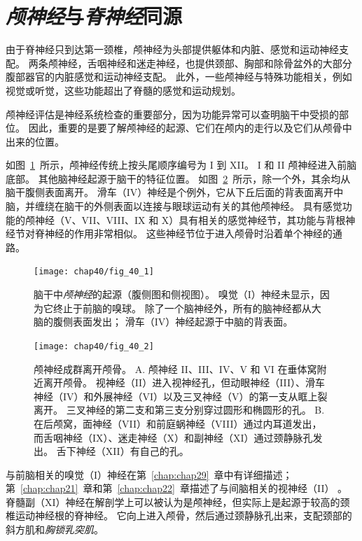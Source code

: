 \section{\textit{颅神经}与\textit{脊神经}同源}

由于脊神经只到达第一颈椎，颅神经为头部提供躯体和内脏、感觉和运动神经支配。
两条颅神经，舌咽神经和迷走神经，也提供颈部、胸部和除骨盆外的大部分腹部器官的内脏感觉和运动神经支配。
此外，一些颅神经与特殊功能相关，例如视觉或听觉，这些功能超出了脊髓的感觉和运动规划。


颅神经评估是神经系统检查的重要部分，因为功能异常可以查明脑干中受损的部位。
因此，重要的是要了解颅神经的起源、它们在颅内的走行以及它们从颅骨中出来的位置。


如图~\ref{fig:40_1}~所示，颅神经传统上按头尾顺序编号为 I 到 XII。
I 和 II 颅神经进入前脑底部。
其他脑神经起源于脑干的特征位置。
如图~\ref{fig:40_2}~所示，除一个外，其余均从脑干腹侧表面离开。
滑车（IV）神经是个例外，它从下丘后面的背表面离开中脑，并缠绕在脑干的外侧表面以连接与眼球运动有关的其他颅神经。
具有感觉功能的颅神经（V、VII、VIII、IX 和 X）具有相关的感觉神经节，其功能与背根神经节对脊神经的作用非常相似。
这些神经节位于进入颅骨时沿着单个神经的通路。


\begin{figure}[htbp]
	\centering
	\texttt{[image: chap40/fig\_40\_1]}
	\caption{脑干中\textit{颅神经}的起源（腹侧图和侧视图）。
		嗅觉（I）神经未显示，因为它终止于前脑的嗅球。
		除了一个脑神经外，所有的脑神经都从大脑的腹侧表面发出； 
		滑车（IV）神经起源于中脑的背表面。}
	\label{fig:40_1}
\end{figure}


\begin{figure}[htbp]
	\centering
	\texttt{[image: chap40/fig\_40\_2]}
	\caption{颅神经成群离开颅骨。
		A. 颅神经 II、III、IV、V 和 VI 在垂体窝附近离开颅骨。
		视神经（II）进入视神经孔，但动眼神经（III）、滑车神经（IV）和外展神经（VI）以及三叉神经（V）的第一支从眶上裂离开。
		三叉神经的第二支和第三支分别穿过圆形和椭圆形的孔。
		B. 在后颅窝，面神经（VII）和前庭蜗神经（VIII）通过内耳道发出，而舌咽神经（IX）、迷走神经（X）和副神经（XI）通过颈静脉孔发出。
		舌下神经（XII）有自己的孔。}
	\label{fig:40_2}
\end{figure}



与前脑相关的嗅觉（I）神经在第~\ref{chap:chap29}~章中有详细描述；
第~\ref{chap:chap21}~章和第~\ref{chap:chap22}~章描述了与间脑相关的视神经（II） 。
脊髓副（XI）神经在解剖学上可以被认为是颅神经，但实际上是起源于较高的颈椎运动神经根的脊神经。
它向上进入颅骨，然后通过颈静脉孔出来，支配颈部的斜方肌和\textit{胸锁乳突肌}。




